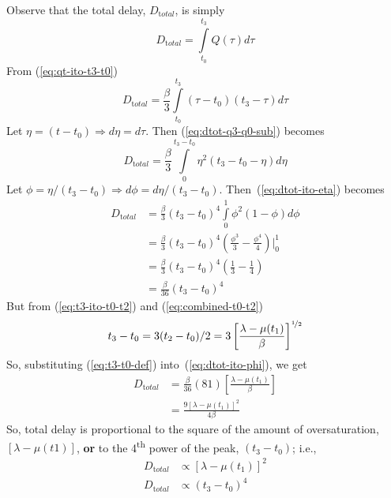 \documentclass[12pt]{report}
\begin{document}
Observe that the total delay, $D_{\mathrm total}$, is simply
\begin{equation}
  \label{eq:dtot-def}
  D_{\mathrm total} = \int\limits_{t_0}^{t_3}Q(\tau)d\tau
\end{equation}
From (\ref{eq:qt-ito-t3-t0})
\begin{equation}
  \label{eq:dtot-q3-q0-sub}
  D_{\mathrm total} = \frac{\beta}{3}\int\limits_{t_0}^{t_3}(\tau-t_0)(t_3-\tau)d\tau
\end{equation}
Let $\eta = (t-t_0) \Rightarrow d\eta = d\tau$.  Then (\ref{eq:dtot-q3-q0-sub}) becomes
\begin{equation}
  \label{eq:dtot-ito-eta}
  D_{\mathrm total} = \frac{\beta}{3}\int\limits_{0}^{t_3-t_0}\eta^2(t_3-t_0-\eta)d\eta
\end{equation}
Let $\phi = \eta/(t_3-t_0) \Rightarrow d\phi = d\eta/(t_3-t_0)$.
Then~(\ref{eq:dtot-ito-eta}) becomes
\begin{equation}
  \label{eq:dtot-ito-phi}
  \begin{split}
    D_{\mathrm total} & = \frac{\beta}{3}(t_3-t_0)^4\int\limits_{0}^{1}\phi^2(1-\phi)d\phi \\
    & = \frac{\beta}{3}(t_3-t_0)^4\left(\frac{\phi^3}{3}-\frac{\phi^4}{4}\right)\Biggr\rvert_{0}^{1} \\
  & = \frac{\beta}{3}(t_3-t_0)^4\left(\frac{1}{3}-\frac{1}{4}\right) \\
  & = \frac{\beta}{36}(t_3-t_0)^4
  \end{split}
\end{equation}
But from (\ref{eq:t3-ito-t0-t2}) and (\ref{eq:combined-t0-t2})
\begin{equation}
  \label{eq:t3-t0-def}
  t_3-t_0=3(t_2-t_0)/2 = 3\left[\frac{\lambda-\mu(t_1)}{\beta}\right]^{\nicefrac{1}{2}}
\end{equation}
So, substituting (\ref{eq:t3-t0-def}) into~(\ref{eq:dtot-ito-phi}), we get
\begin{equation}
  \label{eq:dtot-ito-beta-t1}
  \begin{split}
    D_{\mathrm total} &= \frac{\beta}{36}(81)\left[\frac{\lambda-\mu(t_1)}{\beta}\right]\\
    &= \frac{9[\lambda-\mu(t_1)]^2}{4\beta}
  \end{split}
\end{equation}
So, total delay is proportional to the square of the amount of
oversaturation, $[\lambda-\mu(t1)]$, \textbf{or} to the 4\textsuperscript{th} power of the peak, $(t_3-t_0)$; i.e.,
\begin{subequations}
  \label{dtot-final}
  \begin{align}
    D_{\mathrm total} & \propto [\lambda-\mu(t_1)]^2 \label{eq:dtot-ito-oversat}\\
    D_{\mathrm total} & \propto (t_3-t_0)^4 \label{eq:dtot-ito-peak}
  \end{align}
\end{subequations}
\end{document}
